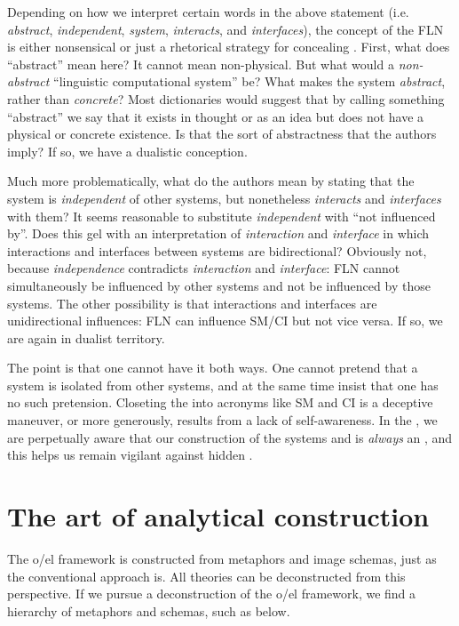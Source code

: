   Depending on how we interpret certain words in the above statement (i.e. \textit{abstract}, \textit{independent}, \textit{system}, \textit{interacts}, and \textit{interfaces}), the concept of the FLN is either nonsensical or just a rhetorical strategy for concealing . First, what does “abstract” mean here? It cannot mean non-physical. But what would a \textit{non-abstract} “linguistic computational system” be? What makes the system \textit{abstract}, rather than \textit{concrete}? Most dictionaries would suggest that by calling something “abstract” we say that it exists in thought or as an idea but does not have a physical or concrete existence. Is that the sort of abstractness that the authors imply? If so, we have a dualistic conception. 

  Much more problematically, what do the authors mean by stating that the system is \textit{independent} of other systems, but nonetheless \textit{interacts} and \textit{interfaces} with them? It seems reasonable to substitute \textit{independent} with “not influenced by”. Does this gel with an interpretation of \textit{interaction} and \textit{interface} in which interactions and interfaces between systems are bidirectional? Obviously not, because \textit{independence} contradicts \textit{interaction} and \textit{interface}: FLN cannot simultaneously be influenced by other systems and not be influenced by those systems. The other possibility is that interactions and interfaces are unidirectional influences: FLN can influence SM/CI but not vice versa. If so, we are again in dualist territory. 

  The point is that one cannot have it both ways. One cannot pretend that a system is isolated from other systems, and at the same time insist that one has no such pretension. Closeting the  into acronyms like SM and CI is a deceptive maneuver, or more generously, results from a lack of self-awareness. In the , we are perpetually aware that our construction of the systems and  is \textit{always} an , and this helps us remain vigilant against hidden .

\section{The art of analytical construction}

The o/el framework is constructed from metaphors and image schemas, just as the conventional approach is. All theories can be deconstructed from this perspective. If we pursue a deconstruction of the o/el framework, we find a hierarchy of metaphors and schemas, such as below. 

